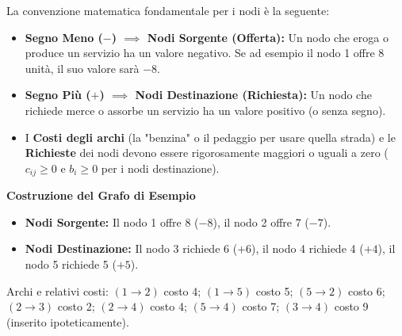 \documentclass[12pt, a4paper]{article}
\begin{document}
	La convenzione matematica fondamentale per i nodi è la seguente:
	\begin{itemize}[label=\textcolor{titlecolor}{\Large\textbullet}, itemsep=2pt, leftmargin=1.5cm]
		\item \textbf{Segno Meno ($-$) $\implies$ Nodi Sorgente (Offerta):} Un nodo che eroga o produce un servizio ha un valore negativo. Se ad esempio il nodo 1 offre 8 unità, il suo valore sarà $-8$.
		\item \textbf{Segno Più ($+$) $\implies$ Nodi Destinazione (Richiesta):} Un nodo che richiede merce o assorbe un servizio ha un valore positivo (o senza segno).
		\item I \textbf{Costi degli archi} (la "benzina" o il pedaggio per usare quella strada) e le \textbf{Richieste} dei nodi devono essere rigorosamente maggiori o uguali a zero ($c_{ij} \geq 0$ e $b_i \geq 0$ per i nodi destinazione).
	\end{itemize}
	
	\vspace{0.4cm}
	\textbf{Costruzione del Grafo di Esempio}\\
	\begin{itemize}[label=$\circ$, itemsep=1pt, leftmargin=1.5cm]
		\item \textbf{Nodi Sorgente:} Il nodo 1 offre 8 ($-8$), il nodo 2 offre 7 ($-7$).
		\item \textbf{Nodi Destinazione:} Il nodo 3 richiede 6 ($+6$), il nodo 4 richiede 4 ($+4$), il nodo 5 richiede 5 ($+5$).
	\end{itemize}
	Archi e relativi costi: $(1\to2)$ costo 4; $(1\to5)$ costo 5; $(5\to2)$ costo 6; $(2\to3)$ costo 2; $(2\to4)$ costo 4; $(5\to4)$ costo 7; $(3\to4)$ costo 9 (inserito ipoteticamente).
	
\end{document}
